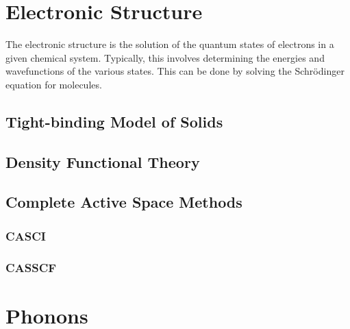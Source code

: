 


\section{Electronic Structure}

The electronic structure is the solution of the quantum states of electrons in a given chemical system. Typically, this involves determining the energies and wavefunctions of the various states. This can be done by solving the Schr{\"o}dinger equation for molecules.

\subsection{Tight-binding Model of Solids}

\subsection{Density Functional Theory}


\subsection {Complete Active Space Methods}

\subsubsection{CASCI}

\subsubsection{CASSCF}

\section{Phonons}







